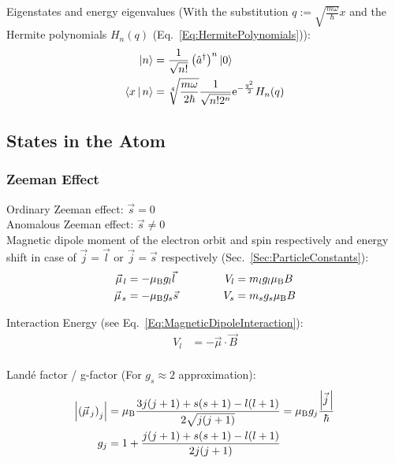 			\noindent
			Eigenstates and energy eigenvalues (With the substitution $q:=\sqrt{\frac{m\omega}{\hbar}}x$ and the Hermite polynomials $H_n(q)$ (Eq.~\ref{Eq:HermitePolynomials})):
			\begin{equation}
				\begin{aligned}
					\Ket{n} &= \frac{1}{\sqrt{n!}}\left(\hat{a}^\dagger\right)^n\Ket{0} \\
					\Braket{x|n} &= \sqrt[4]{\frac{m\omega}{2\hbar}} \frac{1}{\sqrt{n! 2^n}} \mathrm{e}^{-\frac{q^2}{2}} H_n(q) \\
				\end{aligned}
			\end{equation}

	\subsection{States in the Atom}
		\subsubsection{Zeeman Effect}
			\noindent
			Ordinary Zeeman effect: $\vec{s} = 0$ \\
			Anomalous Zeeman effect: $\vec{s}\ne 0$ \\
			\noindent
			Magnetic dipole moment of the electron orbit and spin respectively and energy shift in case of $\vec{j}=\vec{l}$ or $\vec{j}=\vec{s}$ respectively (Sec.~\ref{Sec:ParticleConstants}):
			\begin{equation}
				\begin{aligned}
					\vec{\mu}_l &= -\mu_\text{B} g_l \vec{l} &\hsp V_l &= m_l g_l \mu_\text{B} B\\
					\vec{\mu}_s &= -\mu_\text{B} g_s \vec{s} &\hsp V_s &= m_s g_s \mu_\text{B} B\\
				\end{aligned}
			\end{equation}

			\noindent
			Interaction Energy (see Eq.~\ref{Eq:MagneticDipoleInteraction}):
			\begin{equation}
				\begin{aligned}
					V_l &= -\vec{\mu} \cdot \vec{B} \\
				\end{aligned}
			\end{equation}

			\noindent
			Landé factor / g-factor (For $g_s\approx 2$ approximation):
			\begin{equation}
				\begin{aligned}
					\abs{\qty(\vec{\mu}_j)_j} &= \mu_\text{B}\frac{3j(j+1)+s(s+1)-l(l+1)}{2\sqrt{j(j+1)}} = \mu_\text{B} g_j \frac{\abs{\vec{j}}}{\hbar}\\
					g_j &= 1+\frac{j(j+1) + s(s+1) - l(l+1)}{2j(j+1)} \\
				\end{aligned}
			\end{equation}

